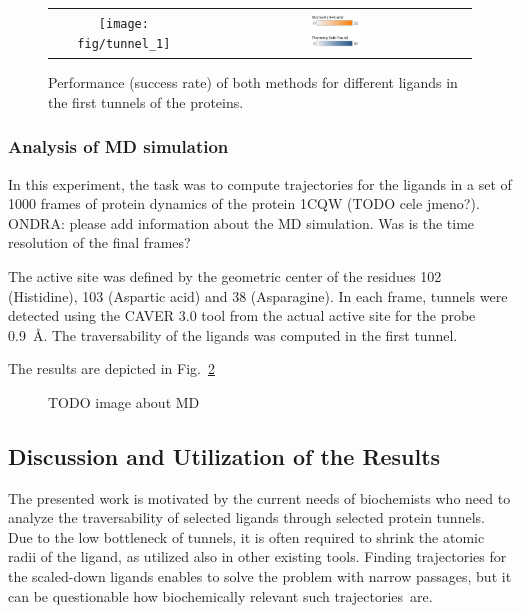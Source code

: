\documentclass{bmcart}
\begin{document}
\begin{figure}
\begin{tabular}{cc}
\texttt{[image: fig/tunnel\_1]} &
\includegraphics[width=0.2\textwidth]{fig/legend} \\
\end{tabular}
\caption{\label{fig::comp1}Performance (success rate) of both methods for different ligands in the first tunnels of the proteins.}
\end{figure}


\subsubsection*{Analysis of MD simulation}

In this experiment, the task was to compute trajectories for the ligands in a set of 1000 frames of protein dynamics
of the protein 1CQW (TODO cele jmeno?).
{\color{red}ONDRA: please add information about the MD simulation. Was is the time resolution of the final frames?}

The active site was defined by the geometric center of the residues 102 (Histidine), 103 (Aspartic acid) and 38 (Asparagine).
In each frame, tunnels were detected using the CAVER 3.0 tool from the actual active site for the probe 0.9~\AA.
The traversability of the ligands was computed in the first tunnel.

The results are depicted in Fig.~\ref{fig::md}

\begin{figure}
\centering
\caption{\label{fig::md}TODO image about MD}
\end{figure}


\subsection*{Discussion and Utilization of the Results}
The presented work is motivated by the current needs of biochemists who need to analyze the traversability of selected ligands through selected protein tunnels.
Due to the low bottleneck of tunnels, it is often required to shrink the atomic radii of the ligand, as utilized also in other existing tools.
Finding trajectories for the scaled-down ligands enables to solve the problem with narrow passages, but it can be questionable how biochemically relevant such trajectories~are.
\end{document}
